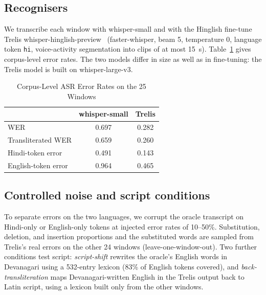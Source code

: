 \documentclass[conference]{IEEEtran}
\begin{document}
\subsection{Recognisers}
We transcribe each window with whisper-small and with the Hinglish fine-tune Trelis whisper-hinglish-preview~\cite{trelis2025} (faster-whisper, beam 5, temperature 0, language token \texttt{hi}, voice-activity segmentation into clips of at most 15~s). Table~\ref{tab:asr} gives corpus-level error rates. The two models differ in size as well as in fine-tuning: the Trelis model is built on whisper-large-v3.

\begin{table}[t]
\caption{Corpus-Level ASR Error Rates on the 25 Windows}
\label{tab:asr}
\centering
\begin{tabular}{lcc}
\toprule
 & whisper-small & Trelis \\
\midrule
WER & 0.697 & 0.282 \\
Transliterated WER & 0.659 & 0.260 \\
Hindi-token error & 0.491 & 0.143 \\
English-token error & 0.964 & 0.465 \\
\bottomrule
\end{tabular}
\end{table}

\subsection{Controlled noise and script conditions}
To separate errors on the two languages, we corrupt the oracle transcript on Hindi-only or English-only tokens at injected error rates of 10--50\%. Substitution, deletion, and insertion proportions and the substituted words are sampled from Trelis's real errors on the other 24 windows (leave-one-window-out). Two further conditions test script: \emph{script-shift} rewrites the oracle's English words in Devanagari using a 532-entry lexicon (83\% of English tokens covered), and \emph{back-transliteration} maps Devanagari-written English in the Trelis output back to Latin script, using a lexicon built only from the other windows.
\end{document}
